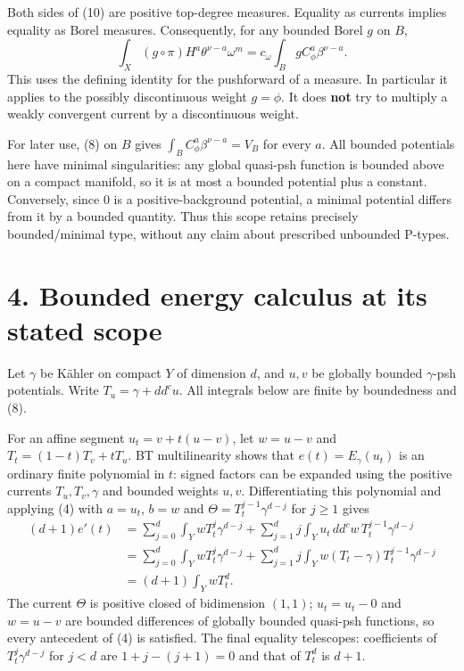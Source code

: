 \documentclass[
  11pt,
]{article}
\begin{document}
Both sides of (10) are positive top-degree measures. Equality as currents implies equality as Borel measures. Consequently, for any bounded Borel \(g\) on \(B\), \[
\int_X(g\circ\pi)H^a\theta^{\nu-a}\omega^m
=c_\omega\int_B g C_\phi^a\beta^{\nu-a}.                            \tag{11}
\] This uses the defining identity for the pushforward of a measure. In particular it applies to the possibly discontinuous weight \(g=\phi\). It does \textbf{not} try to multiply a weakly convergent current by a discontinuous weight.

For later use, (8) on \(B\) gives \(\int_B C_\phi^a\beta^{\nu-a}=V_B\) for every \(a\). All bounded potentials here have minimal singularities: any global quasi-psh function is bounded above on a compact manifold, so it is at most a bounded potential plus a constant. Conversely, since \(0\) is a positive-background potential, a minimal potential differs from it by a bounded quantity. Thus this scope retains precisely bounded/minimal type, without any claim about prescribed unbounded P-types.

\section{4. Bounded energy calculus at its stated scope}\label{bounded-energy-calculus-at-its-stated-scope}

Let \(\gamma\) be Kähler on compact \(Y\) of dimension \(d\), and \(u,v\) be globally bounded \(\gamma\)-psh potentials. Write \(T_u=\gamma+dd^c u\). All integrals below are finite by boundedness and (8).

For an affine segment \(u_t=v+t(u-v)\), let \(w=u-v\) and \(T_t=(1-t)T_v+tT_u\). BT multilinearity shows that \(e(t)=E_\gamma(u_t)\) is an ordinary finite polynomial in \(t\): signed factors can be expanded using the positive currents \(T_u,T_v,\gamma\) and bounded weights \(u,v\). Differentiating this polynomial and applying (4) with \(a=u_t\), \(b=w\) and \(\Theta=T_t^{j-1}\gamma^{d-j}\) for \(j\geq1\) gives \[
\begin{aligned}
(d+1)e'(t)
&=\sum_{j=0}^d\int_YwT_t^j\gamma^{d-j}
+\sum_{j=1}^d j\int_Yu_t\,dd^c w\,T_t^{j-1}\gamma^{d-j}\\
&=\sum_{j=0}^d\int_YwT_t^j\gamma^{d-j}
+\sum_{j=1}^d j\int_Yw(T_t-\gamma)T_t^{j-1}\gamma^{d-j}\\
&=(d+1)\int_YwT_t^d.
\end{aligned}                                                     \tag{12}
\] The current \(\Theta\) is positive closed of bidimension \((1,1)\); \(u_t=u_t-0\) and \(w=u-v\) are bounded differences of globally bounded quasi-psh functions, so every antecedent of (4) is satisfied. The final equality telescopes: coefficients of \(T_t^j\gamma^{d-j}\) for \(j<d\) are \(1+j-(j+1)=0\) and that of \(T_t^d\) is \(d+1\).
\end{document}

